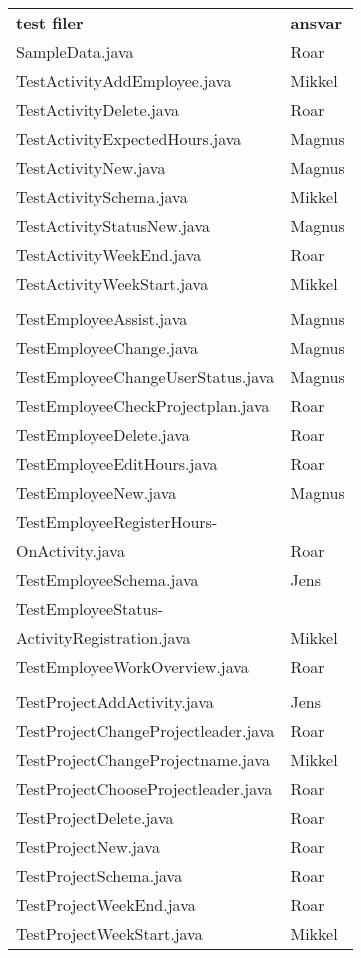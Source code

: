 \begin{multicols}{2}
\begin{table}[H]
\begin{tabular}{ll}
\textbf{test filer}  & \textbf{ansvar} \\
SampleData.java & Roar \\
TestActivityAddEmployee.java                    & Mikkel \\
TestActivityDelete.java                         & Roar \\
TestActivityExpectedHours.java                  & Magnus \\
TestActivityNew.java                            & Magnus \\
TestActivitySchema.java                         & Mikkel \\
TestActivityStatusNew.java
      & Magnus \\
TestActivityWeekEnd.java                        & Roar \\
TestActivityWeekStart.java                      & Mikkel \\
\\
TestEmployeeAssist.java                         & Magnus \\
TestEmployeeChange.java                         & Magnus \\
TestEmployeeChangeUserStatus.java               & Magnus \\
TestEmployeeCheckProjectplan.java               & Roar \\
TestEmployeeDelete.java                         & Roar \\
TestEmployeeEditHours.java                      & Roar \\
TestEmployeeNew.java                            & Magnus \\
TestEmployeeRegisterHours- & ~\\
OnActivity.java        & Roar \\
TestEmployeeSchema.java                         & Jens \\
TestEmployeeStatus- & ~ \\
ActivityRegistration.java & Mikkel \\
TestEmployeeWorkOverview.java                   & Roar \\
\\
TestProjectAddActivity.java                     & Jens \\
TestProjectChangeProjectleader.java             & Roar \\
TestProjectChangeProjectname.java               & Mikkel \\
TestProjectChooseProjectleader.java             & Roar \\
TestProjectDelete.java                          & Roar \\
TestProjectNew.java                             & Roar \\
TestProjectSchema.java                          & Roar \\
TestProjectWeekEnd.java                         & Roar \\
TestProjectWeekStart.java                       & Mikkel \\
\end{tabular}
\end{table}

\end{multicols}

